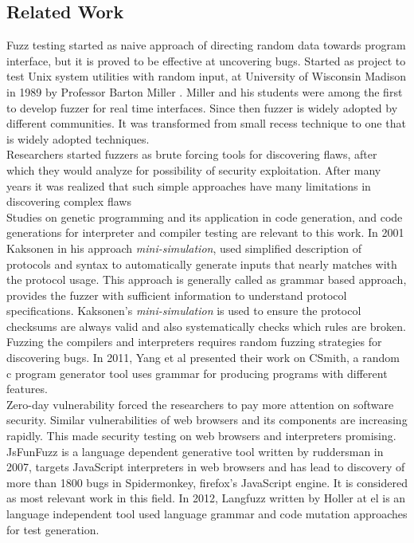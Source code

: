\documentclass{acm_proc_article-sp}
\begin{document}
\subsection{Related Work}
Fuzz testing started as naive approach of directing random data towards program interface, but it is proved to be effective at uncovering bugs. Started as project to test Unix system utilities with random input, at University of Wisconsin Madison in 1989 by Professor Barton Miller \cite{Miller89}. Miller and his students were among the first to develop fuzzer for real time interfaces. Since then fuzzer is widely adopted by different communities. It was transformed from small recess technique to one that is widely adopted techniques. \\
\indent Researchers started fuzzers as brute forcing tools for discovering flaws, after which they would analyze for possibility of security exploitation. After many years it was realized that such simple approaches have many limitations in discovering complex flaws \\
\indent Studies on genetic programming and its application in code generation, and code generations for interpreter and compiler testing  are relevant to this work. In 2001 Kaksonen \cite{Kaksonen} in his approach \textit{mini-simulation}, used simplified description of protocols and syntax to automatically generate inputs that nearly matches with the protocol usage. This approach is generally called as grammar based approach, provides the fuzzer with sufficient information to understand protocol specifications. Kaksonen's \textit{mini-simulation} is used to ensure the protocol checksums are always valid and also systematically checks which rules are broken. \\
\indent Fuzzing the compilers and interpreters requires random fuzzing strategies for discovering bugs. In 2011, Yang et al \cite{Yang} presented their work on CSmith, a random c program generator tool uses grammar for producing programs with different features. \\
\indent Zero-day vulnerability forced the researchers to pay more attention on software security. Similar vulnerabilities of web browsers and its components are increasing rapidly. This made security testing on web browsers and interpreters promising. JsFunFuzz \cite{Jesse07} is a language dependent generative tool written by ruddersman in 2007, targets JavaScript interpreters in web browsers and has lead to discovery of more than 1800 bugs in Spidermonkey, firefox's JavaScript engine. It is considered as most relevant work in this field. In 2012, Langfuzz written by Holler at el \cite{Holler11} is an language independent tool used language grammar and code mutation approaches for test generation.\\
\end{document}

